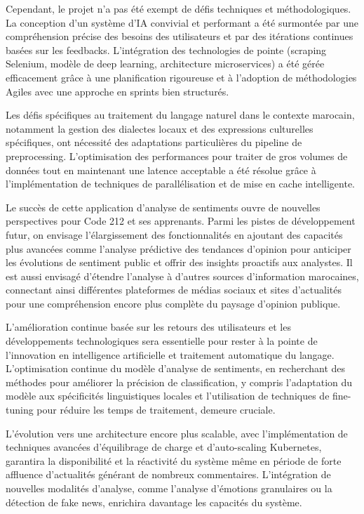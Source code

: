 Cependant, le projet n'a pas été exempt de défis techniques et méthodologiques. La conception d'un système d'IA convivial et performant a été surmontée par une compréhension précise des besoins des utilisateurs et par des itérations continues basées sur les feedbacks. L'intégration des technologies de pointe (scraping Selenium, modèle de deep learning, architecture microservices) a été gérée efficacement grâce à une planification rigoureuse et à l'adoption de méthodologies Agiles avec une approche en sprints bien structurés.

Les défis spécifiques au traitement du langage naturel dans le contexte marocain, notamment la gestion des dialectes locaux et des expressions culturelles spécifiques, ont nécessité des adaptations particulières du pipeline de preprocessing. L'optimisation des performances pour traiter de gros volumes de données tout en maintenant une latence acceptable a été résolue grâce à l'implémentation de techniques de parallélisation et de mise en cache intelligente.

Le succès de cette application d'analyse de sentiments ouvre de nouvelles perspectives pour Code 212 et ses apprenants. Parmi les pistes de développement futur, on envisage l'élargissement des fonctionnalités en ajoutant des capacités plus avancées comme l'analyse prédictive des tendances d'opinion pour anticiper les évolutions de sentiment public et offrir des insights proactifs aux analystes. Il est aussi envisagé d'étendre l'analyse à d'autres sources d'information marocaines, connectant ainsi différentes plateformes de médias sociaux et sites d'actualités pour une compréhension encore plus complète du paysage d'opinion publique.

L'amélioration continue basée sur les retours des utilisateurs et les développements technologiques sera essentielle pour rester à la pointe de l'innovation en intelligence artificielle et traitement automatique du langage. L'optimisation continue du modèle d'analyse de sentiments, en recherchant des méthodes pour améliorer la précision de classification, y compris l'adaptation du modèle aux spécificités linguistiques locales et l'utilisation de techniques de fine-tuning pour réduire les temps de traitement, demeure cruciale.

L'évolution vers une architecture encore plus scalable, avec l'implémentation de techniques avancées d'équilibrage de charge et d'auto-scaling Kubernetes, garantira la disponibilité et la réactivité du système même en période de forte affluence d'actualités générant de nombreux commentaires. L'intégration de nouvelles modalités d'analyse, comme l'analyse d'émotions granulaires ou la détection de fake news, enrichira davantage les capacités du système.

